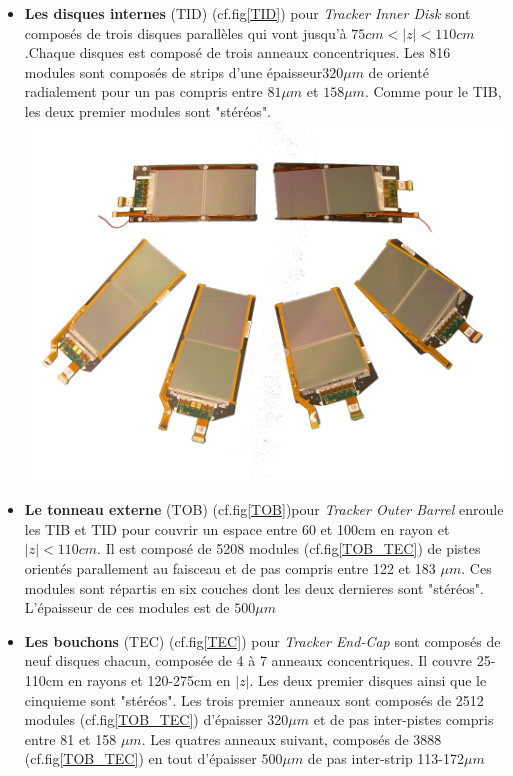 \begin{itemize}[label=$\bullet$]
\item \textbf{Les disques internes} (TID) (cf.fig\ref{TID}) pour \textit{Tracker Inner Disk} sont composés de trois disques parallèles qui vont jusqu'à $75cm<|z|<110cm$.Chaque disques est composé de trois anneaux concentriques. Les 816 modules sont composés de strips d'une épaisseur$320\mu m$ de orienté radialement pour un pas compris entre $81\mu m$ et $158\mu m$. Comme pour le TIB, les deux premier modules sont "stéréos".
\marginpar
{
	\includegraphics[width=\marginparwidth]{CMS/TOB_TEC.png}
	\label{TOB_TEC}
}
\item \textbf{Le tonneau externe } (TOB) (cf.fig\ref{TOB})pour \textit{Tracker Outer Barrel} enroule les TIB et TID pour couvrir un espace entre 60 et 100cm en rayon et $|z|<110cm$. Il est composé de 5208 modules (cf.fig\ref{TOB_TEC}) de pistes orientés parallement au faisceau et de pas compris entre 122 et 183 $\mu m$. Ces modules sont répartis en six couches dont les deux dernieres sont "stéréos". L'épaisseur de ces modules est de $500\mu m$   

\item \textbf{Les bouchons }(TEC) (cf.fig\ref{TEC}) pour \textit{Tracker End-Cap} sont composés de neuf disques chacun, composée de 4 à 7 anneaux concentriques. Il couvre 25-110cm en rayons et 120-275cm en $|z|$. Les deux premier disques ainsi que le cinquieme sont "stéréos". Les trois premier anneaux sont composés de 2512 modules (cf.fig\ref{TOB_TEC}) d'épaisser 320$\mu m$ et de pas inter-pistes compris entre 81 et 158 $\mu m$. Les quatres anneaux suivant, composés de 3888 (cf.fig\ref{TOB_TEC}) en tout d'épaisser $500\mu m$ de pas inter-strip 113-172$\mu m$
\end{itemize}
